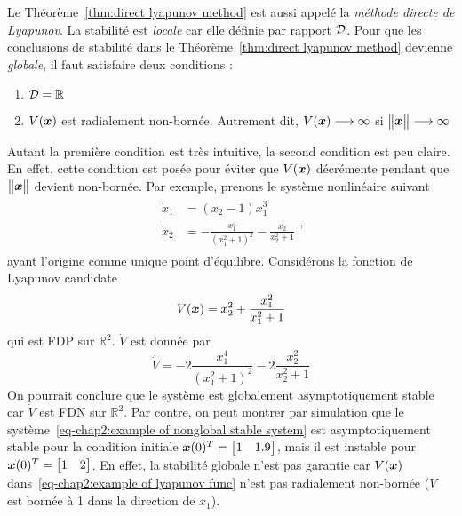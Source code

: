 Le Théorème~\ref{thm:direct lyapunov method} est aussi appelé la \emph{méthode directe de Lyapunov}. La stabilité est \emph{locale} car elle définie par rapport $ {\cal D}$. Pour que les conclusions de stabilité dans le Théorème~\ref{thm:direct lyapunov method} devienne \emph{globale}, il faut satisfaire deux conditions : 
\begin{enumerate}
	\item ${\cal D}=\mathbb{R}$
	\item $V(\bm{x})$ est radialement non-bornée. Autrement dit, $V(\bm{x})\longrightarrow\infty$ si  $\begin{Vmatrix} \bm{x} \end{Vmatrix}\longrightarrow\infty$
\end{enumerate}
Autant la première condition est très intuitive, la second condition est peu claire. En effet, cette condition est posée pour éviter que $V(\bm{x})$ décrémente pendant que $\begin{Vmatrix} \bm{x} \end{Vmatrix}$ devient non-bornée. Par exemple, prenons le système nonlinéaire suivant 
\begin{align}\label{eq-chap2:example of nonglobal stable system}
	\begin{split}
		\dot{x}_1 &=(x_2-1)x_1^3\\
		\dot{x}_2 &=-\frac{x_1^4}{(x_1^2+1)^2}-\frac{x_2}{x_2^2+1}
	\end{split},
\end{align}
ayant l'origine comme unique point d'équilibre. Considérons la fonction de Lyapunov candidate
\begin{equation}\label{eq-chap2:example of lyapunov func}
	V(\bm{x}) = x_2^2 + \frac{x_1^2}{x_1^2+1}
\end{equation}
qui est FDP sur $\mathbb{R}^2$. $\dot{V}$ est donnée par 
\begin{equation*}
	\dot{V} = -2\frac{x_1^4}{(x_1^2+1)^2}-2\frac{x_2^2}{x_2^2+1}
\end{equation*}
On pourrait conclure que le système est globalement asymptotiquement stable car $\dot{V}$ est FDN sur $\mathbb{R}^2$. Par contre, on peut montrer par simulation que le système~\eqref{eq-chap2:example of nonglobal stable system} est asymptotiquement stable pour la condition initiale $\bm{x}(0)^T=\begin{bmatrix}
1 & 1.9
\end{bmatrix}$, mais il est instable pour  $\bm{x}(0)^T=\begin{bmatrix}
1 & 2
\end{bmatrix}$. En effet, la stabilité globale n'est pas garantie car $V(\bm{x})$ dans~\eqref{eq-chap2:example of lyapunov func} n'est pas radialement non-bornée ($V$ est bornée à 1 dans la direction de $x_1$). 

